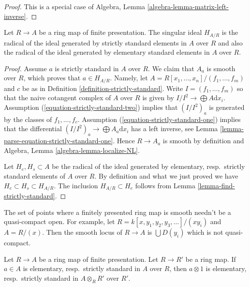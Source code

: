 \begin{proof}
This is a special case of
Algebra, Lemma \ref{algebra-lemma-matrix-left-inverse}.
\end{proof}

\begin{lemma}[Elkik]
\label{lemma-elkik}
Let $R \to A$ be a ring map of finite presentation.
The singular ideal $H_{A/R}$ is the radical of the ideal
generated by strictly standard elements in $A$ over $R$
and also the radical of the ideal generated by elementary
standard elements in $A$ over $R$.
\end{lemma}

\begin{proof}
Assume $a$ is strictly standard in $A$ over $R$. We claim that
$A_a$ is smooth over $R$, which proves that $a \in H_{A/R}$. Namely,
let $A = R[x_1, \ldots, x_n]/(f_1, \ldots, f_m)$ and $c$
be as in Definition \ref{definition-strictly-standard}.
Write $I = (f_1, \ldots, f_m)$ so that the naive cotangent
complex of $A$ over $R$ is given by $I/I^2 \to \bigoplus A\text{d}x_i$.
Assumption (\ref{equation-strictly-standard-two})
implies that $(I/I^2)_a$ is generated by the classes of $f_1, \ldots, f_c$.
Assumption (\ref{equation-strictly-standard-one}) implies
that the differential $(I/I^2)_a \to \bigoplus A_a\text{d}x_i$
has a left inverse, see
Lemma \ref{lemma-parse-equation-strictly-standard-one}.
Hence $R \to A_a$ is smooth by definition and
Algebra, Lemma \ref{algebra-lemma-localize-NL}.

\medskip\noindent
Let $H_e, H_s \subset A$ be the radical of the ideal generated by
elementary, resp.\ strictly standard elements of $A$ over $R$.
By definition and what we just proved we have
$H_e \subset H_s \subset H_{A/R}$. The inclusion $H_{A/R} \subset H_e$
follows from Lemma \ref{lemma-find-strictly-standard}.
\end{proof}

\begin{example}
\label{example-not-quasi-compact}
The set of points where a finitely presented ring map is smooth
needn't be a quasi-compact open. For example, let
$R = k[x, y_1, y_2, y_3, \ldots]/(xy_i)$ and $A = R/(x)$.
Then the smooth locus of $R \to A$ is
$\bigcup D(y_i)$ which is not quasi-compact.
\end{example}

\begin{lemma}
\label{lemma-strictly-standard-base-change}
Let $R \to A$ be a ring map of finite presentation.
Let $R \to R'$ be a ring map. If $a \in A$ is elementary,
resp.\ strictly standard in $A$ over $R$, then $a \otimes 1$
is elementary, resp.\ strictly standard in $A \otimes_R R'$ over $R'$.
\end{lemma}


